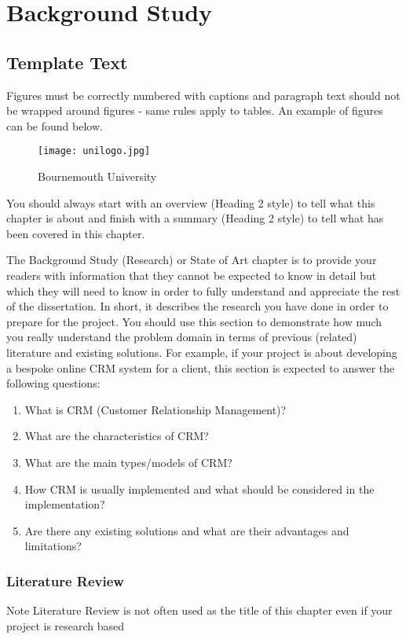 
\chapter{Background Study}
\label{chap:bgStudy}

\section{Template Text}
Figures must be correctly numbered with captions and paragraph text should not be wrapped around figures - same rules apply to tables. An example of figures can be found below.
\begin{figure}[t]
	\centering
	\texttt{[image: unilogo.jpg]}
	\caption{Bournemouth University}
	\label{fig:BULogo2}
\end{figure}
You should always start with an overview (Heading 2 style) to tell what this chapter is about and finish with a summary (Heading 2 style) to tell what has been covered in this chapter.

The Background Study (Research) or State of Art chapter is to provide your readers with information that they cannot be expected to know in detail but which they will need to know in order to fully understand and appreciate the rest of the dissertation. In short, it describes the research you have done in order to prepare for the project. You should use this section to demonstrate how much you really understand the problem domain in terms of previous (related) literature and existing solutions. For example, if your project is about developing a bespoke online CRM system for a client, this section is expected to answer the following questions: 
\begin{enumerate}
	\item What is CRM (Customer Relationship Management)?
	\item What are the characteristics of CRM?
	\item What are the main types/models of CRM?
	\item How CRM is usually implemented and what should be considered in the implementation?
	\item Are there any existing solutions and what are their advantages and limitations?
\end{enumerate}

\subsection{Literature Review}
Note Literature Review is not often used as the title of this chapter even if your project is research based



